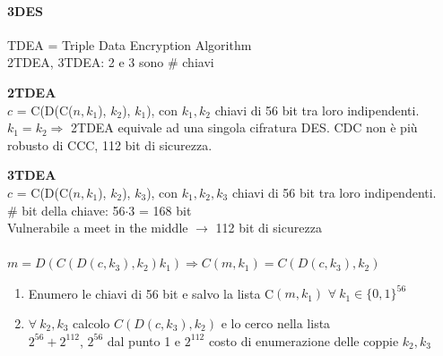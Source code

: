 \documentclass[10pt]{book}
\begin{document}
\paragraph{3DES} TDEA = Triple Data Encryption Algorithm\\
2TDEA, 3TDEA: 2 e 3 sono \# chiavi\begin{list}{}{}
	\item \textbf{2TDEA}\\
	$c$ = C(D(C($n, k_1$), $k_2$), $k_1$), con $k_1, k_2$ chiavi di 56 bit tra loro indipendenti.\\
	$k_1 = k_2 \Rightarrow$ 2TDEA equivale ad una singola cifratura DES. CDC non è più robusto di CCC, 112 bit di sicurezza.
	\item \textbf{3TDEA}\\
	$c$ = C(D(C($n, k_1$), $k_2$), $k_3$), con $k_1, k_2, k_3$ chiavi di 56 bit tra loro indipendenti.\\
	\# bit della chiave: 56$\cdot$3 = 168 bit\\
	Vulnerabile a meet in the middle $\rightarrow$ 112 bit di sicurezza\\\pagebreak\\
	$m = D(C(D(c, k_3), k_2) k_1) \Rightarrow C(m, k_1) = C(D(c, k_3), k_2)$
	\begin{enumerate}
		\item Enumero le chiavi di 56 bit e salvo la lista C$(m, k_1)$ $\forall\:k_1 \in \{0, 1\}^{56}$
		\item $\forall\:k_2, k_3$ calcolo $C(D(c, k_3), k_2)$ e lo cerco nella lista\\
		$2^{56} + 2^{112}$, $2^{56}$ dal punto 1 e $2^{112}$ costo di enumerazione delle coppie $k_2, k_3$
	\end{enumerate}
\end{list}
\end{document}
